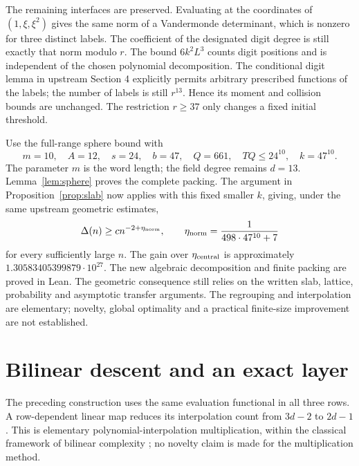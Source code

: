 \documentclass[11pt]{article}
\begin{document}
The remaining interfaces are preserved. Evaluating at the coordinates
of \((1,\xi,\xi^2)\) gives the same norm of a Vandermonde determinant,
which is nonzero for three distinct labels. The coefficient of the
designated digit degree is still exactly that norm modulo \(r\).
The bound \(6k^2L^3\) counts digit positions and is independent of the
chosen polynomial decomposition. The conditional digit lemma in
upstream Section 4 explicitly permits arbitrary prescribed functions
of the labels; the number of labels is still \(r^{13}\).
Hence its moment and collision bounds are unchanged.
The restriction \(r\ge37\) only changes a fixed initial threshold.

Use the full-range sphere bound with
\[
 m=10,\quad A=12,\quad s=24,\quad b=47,\quad Q=661,\quad
 TQ\le24^{10},\quad k=47^{10}.
\]
The parameter \(m\) is the word length; the field degree remains \(d=13\).
Lemma~\ref{lem:sphere} proves the complete packing.
The argument in Proposition~\ref{prop:slab} now applies with this fixed
smaller \(k\), giving, under the same upstream geometric estimates,
\[
 \Delta(n)\ge c n^{-2+\eta_{\rm norm}},\qquad
 \eta_{\rm norm}=\frac1{498\cdot47^{10}+7}
\]
for every sufficiently large \(n\).
The gain over \(\eta_{\rm central}\) is approximately
\(1.30583405399879\cdot10^{27}\).
The new algebraic decomposition and finite packing are proved in Lean.
The geometric consequence still relies on the written slab, lattice,
probability and asymptotic transfer arguments.
The regrouping and interpolation are elementary; novelty, global
optimality and a practical finite-size improvement are not established.

\section{Bilinear descent and an exact layer}\label{sec:bilinear}
The preceding construction uses the same evaluation functional in all
three rows. A row-dependent linear map reduces its interpolation count
from \(3d-2\) to \(2d-1\). This is elementary polynomial-interpolation
multiplication, within the classical framework of bilinear complexity
\cite{bilinear}; no novelty claim is made for the multiplication method.
\end{document}
